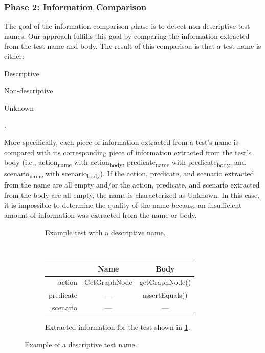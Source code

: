 \subsubsection{Phase 2: Information Comparison}
\label{sec:InformationComparison}

The goal of the information comparison phase is to detect non-descriptive test names.
%
Our approach fulfills this goal by comparing the information extracted from the test name and body.
%
The result of this comparison is that a test name is either:
\begin{enumerate*}[itemjoin*={{, or }}]
    \item Descriptive
    \item Non-descriptive
    \item Unknown
\end{enumerate*}.


More specifically, each piece of information extracted from a test's name is compared with its corresponding piece of information extracted from the test's body (i.e., action\textsubscript{name} with action\textsubscript{body}, predicate\textsubscript{name} with predicate\textsubscript{body}, and scenario\textsubscript{name} with scenario\textsubscript{body}).
% 
If the action, predicate, and scenario extracted from the name are all empty and\slash or the action, predicate, and scenario extracted from the body are all empty, the name is characterized as Unknown.
%
In this case, it is impossible to determine the quality of the name because an insufficient amount of information was extracted from the name or body.


\begin{figure}[t]
    \centering
    \begin{subfigure}{0.9\textwidth}
    \centering
        \caption{Example test with a descriptive name.}
        \label{PatternExample_detected4_code}
    \end{subfigure}
    \\[0.5ex]
    \begin{subfigure}{0.9\textwidth}
    \centering
        \begin{tabular}{rcc}
        \toprule
                  & Name    & Body    \\
        \midrule
        action    & GetGraphNode  & getGraphNode()     \\
        predicate & ---           & assertEquals()     \\
        scenario  & ---           & ---                \\
        \bottomrule
        \end{tabular}
        \caption{Extracted information for the test shown in \cref{PatternExample_detected4_code}.}
        \label{PatternExample_detected4}
    \end{subfigure}
    \caption{Example of a descriptive test name.}
    \label{fig:descriptive-examples}
\end{figure}


